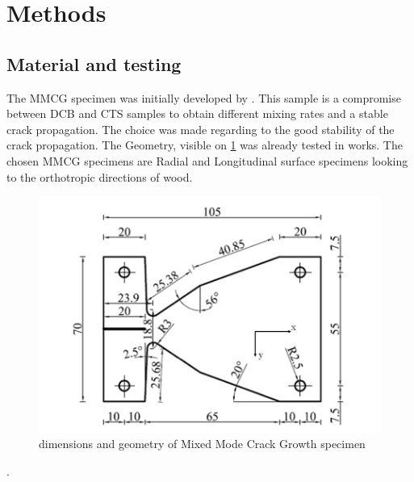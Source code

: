 \documentclass[3p,times,procedia]{elsarticle}
\begin{document}
\section{Methods}\label{S:method}

\subsection{Material and testing}\label{Ss:spec}

The MMCG specimen was initially developed by \citet{MoutouPitti2008}. This sample is a compromise between DCB and CTS samples to obtain different mixing rates and a stable crack propagation. The choice was made regarding to the good stability of the crack propagation. The Geometry, visible on \ref{fig:Fig5} was already tested in \citep{Odounga2018phd} works. The chosen MMCG specimens are Radial and Longitudinal surface specimens looking to the orthotropic directions of wood. 

\begin{figure}[th]
	\centering
	\includegraphics[scale=0.5]{Figures/fig23}
	\caption[MMCG specimen]{dimensions and geometry of Mixed Mode Crack Growth specimen}
	\label{fig:Fig5}
\end{figure}.
\end{document}

